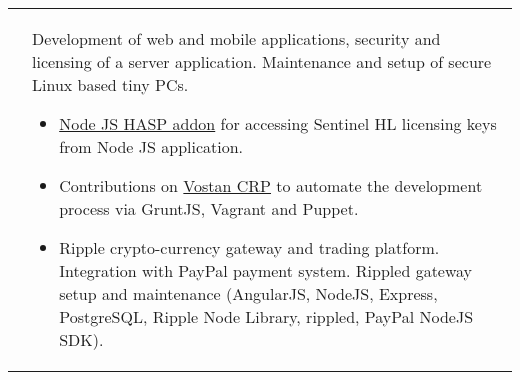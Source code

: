 \documentclass[a4paper,10pt]{article}
\begin{document}
\begin{tabular}{r|p{11cm}}
& \footnotesize{ Development of web and mobile applications, security and
licensing of a server application. Maintenance and setup of secure Linux based
tiny PCs.
  \begin{itemize}
    \item \href{https://github.com/vahe-evoyan/node-hasp/releases}
      {Node JS HASP addon} for accessing Sentinel HL licensing keys from
      Node JS application.
    \item Contributions on \href{https://github.com/InstigateMobile/vostan}
      {Vostan CRP} to automate the development process via GruntJS, Vagrant
      and Puppet.
    \item Ripple crypto-currency gateway and trading platform. Integration
    with PayPal payment system. Rippled gateway setup and maintenance
    (AngularJS, NodeJS, Express, PostgreSQL, Ripple Node Library, rippled,
    PayPal NodeJS SDK).
  \end{itemize}
} \\


\end{tabular}

\end{document}
